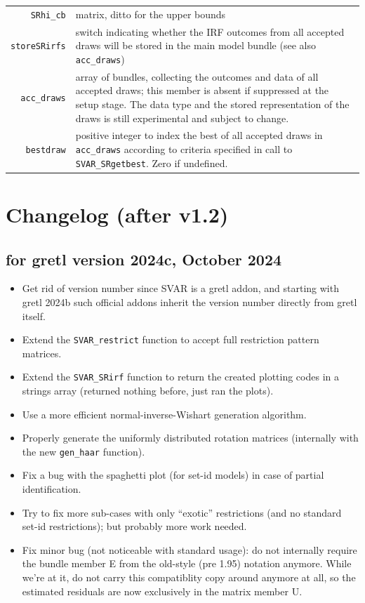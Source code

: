 \documentclass[a4paper,10pt]{article}
\newcommand{\cmd}[1]{\texttt{#1}}
\begin{document}
\begin{tabular}{rp{}}
  \texttt{SRhi\_cb} & matrix, ditto for the upper bounds\\
  
   \texttt{storeSRirfs} & switch indicating whether the IRF outcomes from all accepted draws
     will be stored in the main model bundle (see also \texttt{acc\_draws})\\
   \texttt{acc\_draws} & array of bundles, collecting the outcomes and data of all accepted 
   draws; this member is absent if suppressed at the setup stage. The data type and the 
   stored representation of the draws is still experimental and subject to change.\\
   
   \texttt{bestdraw} & positive integer to index the best of all accepted draws in \texttt{acc\_draws} 
   according to criteria specified in call to \texttt{SVAR\_SRgetbest}. Zero if undefined. 
  \end{tabular}
  
\section{Changelog (after v1.2)}
\label{sec:changelog}

\subsection*{for gretl version 2024c, October 2024}
\begin{itemize}
  \item Get rid of version number since SVAR is a gretl addon, and starting
   with gretl 2024b such official addons inherit the version number directly
   from gretl itself.
  \item Extend the \cmd{SVAR\_restrict} function to accept full restriction pattern matrices.
  \item Extend the \cmd{SVAR\_SRirf} function to return the created plotting codes
   in a strings array (returned nothing before, just ran the plots).
  \item Use a more efficient normal-inverse-Wishart generation algorithm.
  \item Properly generate the uniformly distributed rotation matrices (internally 
   with the new \cmd{gen\_haar} function). 
  \item Fix a bug with the spaghetti plot (for set-id models) in case of partial
   identification.
  \item Try to fix more sub-cases with only ``exotic'' restrictions (and no standard 
   set-id restrictions); but probably more work needed. 
  \item Fix minor bug (not noticeable with standard usage): do not internally
   require the bundle member E from the old-style (pre 1.95) notation anymore.
   While we're at it, do not carry this compatiblity copy around anymore at
   all, so the estimated residuals are now exclusively in the matrix member U.   
\end{itemize}
\end{document}
